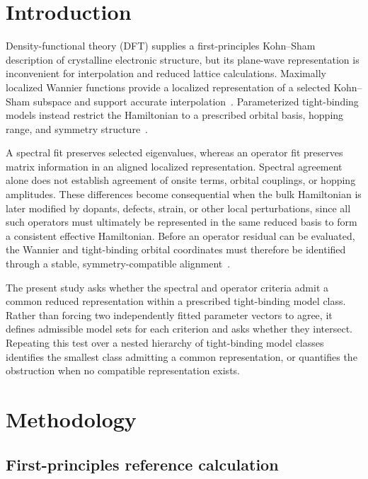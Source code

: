 \documentclass[preprint,12pt]{elsarticle}
\begin{document}
\section{Introduction}
\label{sec:introduction}

Density-functional theory (DFT) supplies a first-principles Kohn--Sham
description of crystalline electronic structure, but its plane-wave
representation is inconvenient for interpolation and reduced lattice
calculations. Maximally localized Wannier functions provide a localized
representation of a selected Kohn--Sham subspace and support accurate
interpolation~\cite{marzari2012,pizzi2020,souza2001,yates2007}. Parameterized
tight-binding models instead restrict the Hamiltonian to a prescribed orbital
basis, hopping range, and symmetry structure~\cite{slater1954,vogl1983}.

A spectral fit preserves selected eigenvalues, whereas an operator fit
preserves matrix information in an aligned localized representation. Spectral
agreement alone does not establish agreement of onsite terms, orbital
couplings, or hopping amplitudes. These differences become consequential when
the bulk Hamiltonian is later modified by dopants, defects, strain, or other
local perturbations, since all such operators must ultimately be represented
in the same reduced basis to form a consistent effective Hamiltonian. Before
an operator residual can be evaluated, the Wannier and tight-binding orbital
coordinates must therefore be identified through a stable, symmetry-compatible
alignment~\cite{bjork1973,higham1986}.

The present study asks whether the spectral and operator criteria admit a
common reduced representation within a prescribed tight-binding model class.
Rather than forcing two independently fitted parameter vectors to agree, it
defines admissible model sets for each criterion and asks whether they
intersect. Repeating this test over a nested hierarchy of tight-binding model
classes identifies the smallest class admitting a common representation, or
quantifies the obstruction when no compatible representation exists.

\section{Methodology}
\label{sec:methodology}

\subsection{First-principles reference calculation}
\label{sec:dft-reference}
\end{document}
